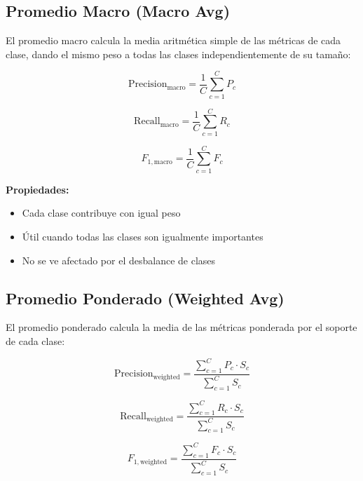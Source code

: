 \documentclass[12pt]{article}
\begin{document}
\subsection{Promedio Macro (Macro Avg)}

El promedio macro calcula la media aritmética simple de las métricas de cada clase, dando el mismo peso a todas las clases independientemente de su tamaño:

\begin{equation}
\text{Precision}_{\text{macro}} = \frac{1}{C} \sum_{c=1}^{C} P_c
\end{equation}

\begin{equation}
\text{Recall}_{\text{macro}} = \frac{1}{C} \sum_{c=1}^{C} R_c
\end{equation}

\begin{equation}
F_{1,\text{macro}} = \frac{1}{C} \sum_{c=1}^{C} F_c
\end{equation}

\textbf{Propiedades:}
\begin{itemize}
\item Cada clase contribuye con igual peso
\item Útil cuando todas las clases son igualmente importantes
\item No se ve afectado por el desbalance de clases
\end{itemize}

\subsection{Promedio Ponderado (Weighted Avg)}

El promedio ponderado calcula la media de las métricas ponderada por el soporte de cada clase:

\begin{equation}
\text{Precision}_{\text{weighted}} = \frac{\sum_{c=1}^{C} P_c \cdot S_c}{\sum_{c=1}^{C} S_c}
\end{equation}

\begin{equation}
\text{Recall}_{\text{weighted}} = \frac{\sum_{c=1}^{C} R_c \cdot S_c}{\sum_{c=1}^{C} S_c}
\end{equation}

\begin{equation}
F_{1,\text{weighted}} = \frac{\sum_{c=1}^{C} F_c \cdot S_c}{\sum_{c=1}^{C} S_c}
\end{equation}
\end{document}
